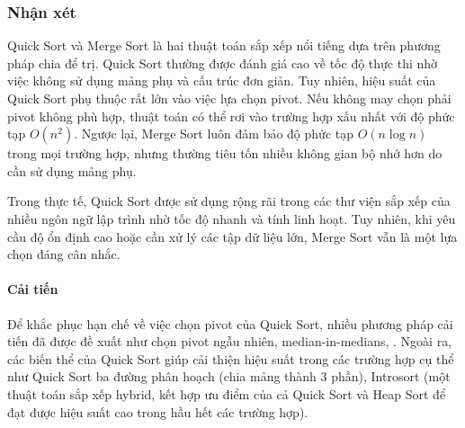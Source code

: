 \subsubsection{Nhận xét}

Quick Sort và Merge Sort là hai thuật toán sắp xếp nổi tiếng dựa trên phương pháp chia để trị. Quick Sort thường được đánh giá cao về tốc độ thực thi nhờ việc không sử dụng mảng phụ và cấu trúc đơn giản. Tuy nhiên, hiệu suất của Quick Sort phụ thuộc rất lớn vào việc lựa chọn pivot. Nếu không may chọn phải pivot không phù hợp, thuật toán có thể rơi vào trường hợp xấu nhất với độ phức tạp $O(n^2)$. Ngược lại, Merge Sort luôn đảm bảo độ phức tạp $O(n \log{n})$ trong mọi trường hợp, nhưng thường tiêu tốn nhiều không gian bộ nhớ hơn do cần sử dụng mảng phụ. 

Trong thực tế, Quick Sort được sử dụng rộng rãi trong các thư viện sắp xếp của nhiều ngôn ngữ lập trình nhờ tốc độ nhanh và tính linh hoạt. Tuy nhiên, khi yêu cầu độ ổn định cao hoặc cần xử lý các tập dữ liệu lớn, Merge Sort vẫn là một lựa chọn đáng cân nhắc.

\paragraph{Cải tiến}
Để khắc phục hạn chế về việc chọn pivot của Quick Sort, nhiều phương pháp cải tiến đã được đề xuất như chọn pivot ngẫu nhiên, median-in-medians, . Ngoài ra, các biến thể của Quick Sort giúp cải thiện hiệu suất trong các trường hợp cụ thể như Quick Sort ba đường phân hoạch (chia mảng thành 3 phần), Introsort (một thuật toán sắp xếp hybrid, kết hợp ưu điểm của cả Quick Sort và Heap Sort để đạt được hiệu suất cao trong hầu hết các trường hợp).

